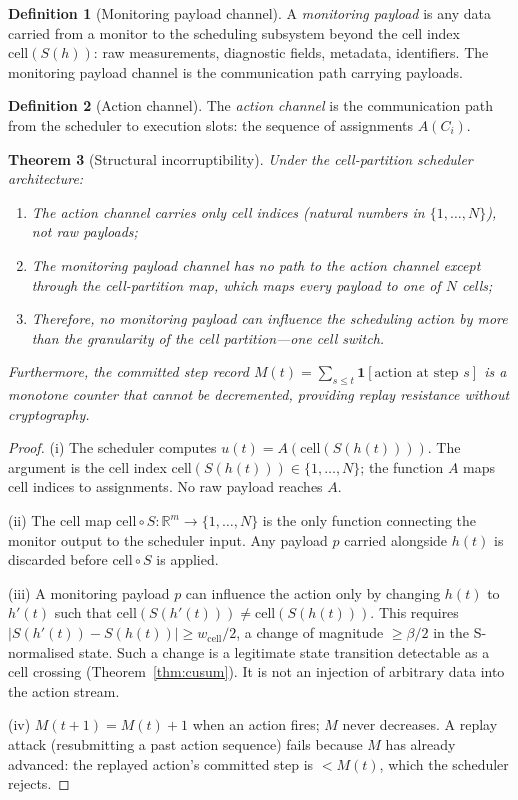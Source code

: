 \documentclass[11pt,twocolumn,a4paper]{article}
\theoremstyle{plain}
\newtheorem{theorem}{Theorem}[section]
\theoremstyle{definition}
\newtheorem{definition}[theorem]{Definition}
\theoremstyle{remark}
\newcommand{\R}{\mathbb{R}}
\newcommand{\floor}{\beta}
\newcommand{\cell}{\mathrm{cell}}
\newcommand{\Scal}{S}
\begin{document}
\begin{definition}[Monitoring payload channel]
\label{def:payload}
A \emph{monitoring payload} is any data carried from a monitor to the scheduling subsystem beyond the cell index $\cell(\Scal(h))$: raw measurements, diagnostic fields, metadata, identifiers. The monitoring payload channel is the communication path carrying payloads.
\end{definition}

\begin{definition}[Action channel]
\label{def:action}
The \emph{action channel} is the communication path from the scheduler to execution slots: the sequence of assignments $A(C_i)$.
\end{definition}

\begin{theorem}[Structural incorruptibility]
\label{thm:incorrupt}
Under the cell-partition scheduler architecture:
\begin{enumerate}[label=(\roman*)]
\item The action channel carries only cell indices (natural numbers in $\{1, \ldots, N\}$), not raw payloads;
\item The monitoring payload channel has no path to the action channel except through the cell-partition map, which maps every payload to one of $N$ cells;
\item Therefore, no monitoring payload can influence the scheduling action by more than the granularity of the cell partition---one cell switch.
\end{enumerate}
Furthermore, the \emph{committed step record} $M(t) = \sum_{s \leq t} \mathbf{1}[\text{action at step }s]$ is a monotone counter that cannot be decremented, providing replay resistance without cryptography.
\end{theorem}

\begin{proof}
(i) The scheduler computes $u(t) = A(\cell(\Scal(h(t))))$. The argument is the cell index $\cell(\Scal(h(t))) \in \{1,\ldots,N\}$; the function $A$ maps cell indices to assignments. No raw payload reaches $A$.

(ii) The cell map $\cell \circ \Scal : \R^m \to \{1,\ldots,N\}$ is the only function connecting the monitor output to the scheduler input. Any payload $p$ carried alongside $h(t)$ is discarded before $\cell \circ \Scal$ is applied.

(iii) A monitoring payload $p$ can influence the action only by changing $h(t)$ to $h'(t)$ such that $\cell(\Scal(h'(t))) \neq \cell(\Scal(h(t)))$. This requires $|\Scal(h'(t)) - \Scal(h(t))| \geq w_{\cell}/2$, a change of magnitude $\geq \floor/2$ in the S-normalised state. Such a change is a legitimate state transition detectable as a cell crossing (Theorem~\ref{thm:cusum}). It is not an injection of arbitrary data into the action stream.

(iv) $M(t+1) = M(t) + 1$ when an action fires; $M$ never decreases. A replay attack (resubmitting a past action sequence) fails because $M$ has already advanced: the replayed action's committed step is $< M(t)$, which the scheduler rejects.
\end{proof}
\end{document}
